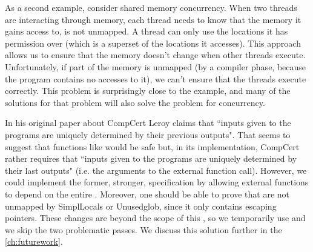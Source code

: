 As a second example, consider shared memory concurrency. When two threads are interacting through memory, each thread needs to know that the memory it gains access to, is not unmapped. A thread can only use the locations it has permission over (which is a superset of the locations it accesses). This approach allows us to ensure that the memory doesn't change when other threads execute. Unfortunately, if part of the memory is unmapped (by a compiler phase, because the program contains no accesses to it), we can't ensure that the threads execute correctly. This problem is surprisingly close to the   example, and many of the solutions for that problem will also solve the problem for concurrency. 

In his original paper about CompCert Leroy \cite{Leroy-Compcert-CACM} claims that ``inputs given to the programs are uniquely determined by their previous outputs". That seems to suggest that functions like  would be safe but, in its implementation, CompCert rather requires that ``inputs given to the programs are uniquely determined by their last outputs" (i.e. the arguments to the external function call). However, we could implement the former, stronger, specification by allowing external functions to depend on the entire . Moreover, one should be able to prove that  are not unmapped by SimplLocals or Unusedglob, since it only contains escaping pointers. These changes are beyond the scope of this , so we temporarily use  and we skip the two problematic passes. We discuss this solution further in the \cref{ch:futurework}.

